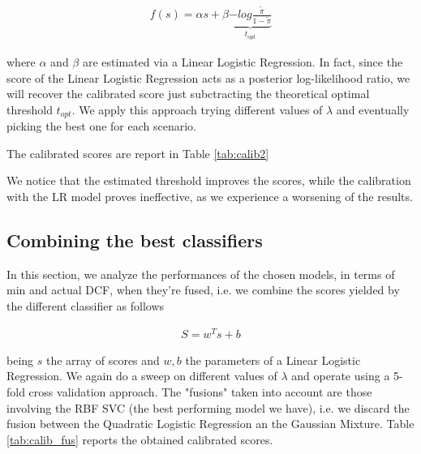 \begin{align*}
	f(s) = \alpha s + \beta \underbrace{- log \tfrac{\tilde{\pi}}{1- \tilde{\pi}}}_{t_{opt}}
\end{align*}

where $\alpha$ and $\beta$ are estimated via a Linear Logistic Regression. In fact, since the score of the Linear Logistic Regression acts as a posterior log-likelihood ratio, we will recover the calibrated score just subctracting the theoretical optimal threshold $t_{opt}$. We apply this approach trying different values of $\lambda$ and eventually picking the best one for each scenario.

The calibrated scores are report in Table \ref{tab:calib2}


\noindent
\begin{table}[H]
	\caption{actual estimated and calibrated DCF for the best performing models}
	\label{tab:calib2}
\end{table}

We notice that the estimated threshold improves the scores, while the calibration with the LR model proves ineffective, as we experience a worsening of the results. 


\subsection{Combining the best classifiers}
In this section, we analyze the performances of the chosen models, in terms of min and actual DCF, when they're fused, i.e. we combine the scores yielded by the different classifier as follows

\begin{align*}
	S = w^T s + b
\end{align*}

being $s$ the array of scores and $w, b$ the parameters of a Linear Logistic Regression. We again do a sweep on different values of $\lambda$ and operate using a 5-fold cross validation approach. The "fusions" taken into account are those involving the RBF SVC (the best performing model we have), i.e. we discard the fusion between the Quadratic Logistic Regression an the Gaussian Mixture. Table \ref{tab:calib_fus} reports the obtained calibrated scores.


